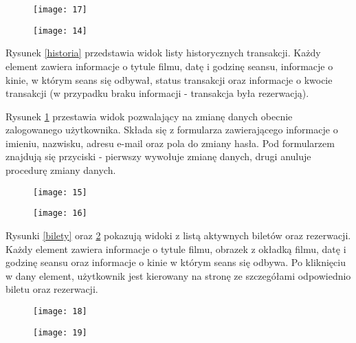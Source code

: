 \newpage
\begin{figure}[h]
\centering
\begin{minipage}{.5\textwidth}
  \centering
  \texttt{[image: 17]}
  \label{historia}
\end{minipage}%
\begin{minipage}{.5\textwidth}
  \centering
  \texttt{[image: 14]}
  \label{zmiana}
\end{minipage}
\end{figure}
Rysunek \ref{historia} przedstawia widok listy historycznych transakcji. Każdy element zawiera informacje o tytule filmu, datę i godzinę seansu, informacje o kinie, w którym seans się odbywał, status transakcji oraz informacje o kwocie transakcji (w przypadku braku informacji - transakcja była rezerwacją).

Rysunek \ref{zmiana} przestawia widok pozwalający na zmianę danych obecnie zalogowanego użytkownika. Składa się z formularza zawierającego informacje o imieniu, nazwisku, adresu e-mail oraz pola do zmiany hasła. Pod formularzem znajdują się przyciski - pierwszy wywołuje zmianę danych, drugi anuluje procedurę zmiany danych.
\newpage
\begin{figure}[h]
\centering
\begin{minipage}{.5\textwidth}
  \centering
  \texttt{[image: 15]}
  \label{bilety}
\end{minipage}%
\begin{minipage}{.5\textwidth}
  \centering
  \texttt{[image: 16]}
  \label{rezerwacje}
\end{minipage}
\end{figure}

Rysunki \ref{bilety} oraz \ref{rezerwacje} pokazują widoki z listą aktywnych biletów oraz rezerwacji. Każdy element zawiera informacje o tytule filmu, obrazek z okładką filmu, datę i godzinę seansu oraz informacje o kinie w którym seans się odbywa. Po kliknięciu w dany element, użytkownik jest kierowany na stronę ze szczegółami odpowiednio biletu oraz rezerwacji.

\newpage
\begin{figure}[h]
\centering
\begin{minipage}{.5\textwidth}
  \centering
  \texttt{[image: 18]}
  \label{bilet}
\end{minipage}%
\begin{minipage}{.5\textwidth}
  \centering
  \texttt{[image: 19]}
  \label{rezerwacja}
\end{minipage}
\end{figure}

